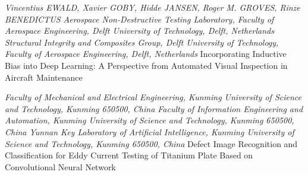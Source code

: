 \documentclass[a4paper, 14pt]{article}
\numberwithin{equation}{section}
\numberwithin{table}{section}
\begin{document}
\begin{thebibliography}{}
  
\textit{Vincentius EWALD, Xavier GOBY, Hidde JANSEN, Roger M. GROVES, Rinze BENEDICTUS 
Aerospace Non-Destructive Testing Laboratory, Faculty of Aerospace Engineering, Delft University of Technology, Delft, Netherlands
Structural Integrity and Composites Group, Delft University of Technology, Faculty of Aerospace Engineering, Delft, Netherlands} Incorporating Inductive Bias into Deep Learning: A Perspective from Automated Visual Inspection in Aircraft Maintenance \label{lit:report1}

\textit{Faculty of Mechanical and Electrical Engineering, Kunming University of Science and Technology, Kunming 650500, China
Faculty of Information Engineering and Automation, Kunming University of Science and Technology, Kunming 650500, China
Yunnan Key Laboratory of Artificial Intelligence, Kunming University of Science and Technology, Kunming 650500, China} Defect Image Recognition and Classification for Eddy Current Testing of Titanium Plate Based on Convolutional Neural Network \label{lit:report2}
\end{thebibliography}
\end{document}
